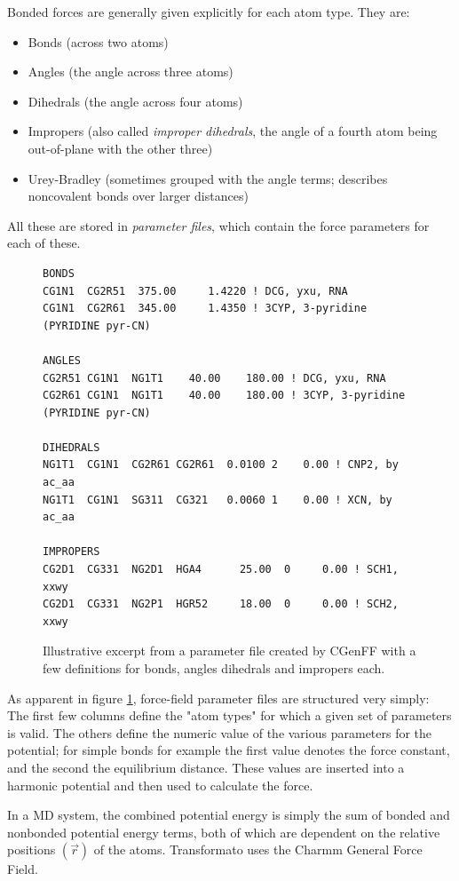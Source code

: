 \documentclass[oneside]{scrreprt}
\begin{document}
Bonded forces are generally given explicitly for each atom type. They are:
\begin{itemize}
    \item Bonds (across two atoms)
    \item Angles (the angle across three atoms)
    \item Dihedrals (the angle across four atoms)
    \item Impropers (also called \emph{improper dihedrals}, the angle of a fourth atom being out-of-plane with the other three)
    \item Urey-Bradley (sometimes grouped with the angle terms; describes noncovalent bonds over larger distances)
\end{itemize}

All these are stored in \emph{parameter files}, which contain the force parameters for each of these.

\begin{figure}
\small
\begin{verbatim}
BONDS
CG1N1  CG2R51  375.00     1.4220 ! DCG, yxu, RNA
CG1N1  CG2R61  345.00     1.4350 ! 3CYP, 3-pyridine (PYRIDINE pyr-CN)

ANGLES
CG2R51 CG1N1  NG1T1    40.00    180.00 ! DCG, yxu, RNA
CG2R61 CG1N1  NG1T1    40.00    180.00 ! 3CYP, 3-pyridine (PYRIDINE pyr-CN)

DIHEDRALS
NG1T1  CG1N1  CG2R61 CG2R61  0.0100 2    0.00 ! CNP2, by ac_aa
NG1T1  CG1N1  SG311  CG321   0.0060 1    0.00 ! XCN, by ac_aa

IMPROPERS
CG2D1  CG331  NG2D1  HGA4      25.00  0     0.00 ! SCH1, xxwy
CG2D1  CG331  NG2P1  HGR52     18.00  0     0.00 ! SCH2, xxwy

\end{verbatim}
   \caption{Illustrative excerpt from a parameter file created by CGenFF with a few definitions for bonds, angles dihedrals and impropers each.}
    \label{fig:parmfile}
\end{figure}

As apparent in figure \ref{fig:parmfile}, force-field parameter files are structured very simply: The first few columns define the "atom types" for which a given set of parameters is valid. The others define the numeric value of the various parameters for the potential; for simple bonds for example the first value denotes the force constant, and the second the equilibrium distance. These values are inserted into a harmonic potential and then used to calculate the force. 


In a MD system, the combined potential energy is simply the sum of bonded and nonbonded potential energy terms, both of which are dependent on the relative positions $(\Vec{r})$ of the atoms. Transformato uses the Charmm General Force Field\cite{vanommeslaeghe_charmm_2010}.
\end{document}
